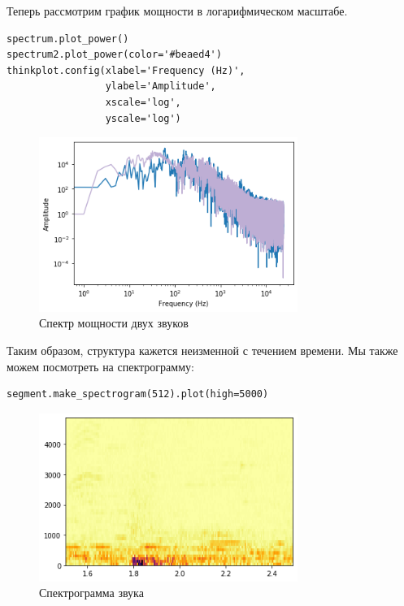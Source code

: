 \documentclass[a4paper,12pt]{report}
\begin{document}
Теперь рассмотрим график мощности в логарифмическом масштабе.

\begin{lstlisting}[caption=Спектр мощности двух звуков]
spectrum.plot_power()
spectrum2.plot_power(color='#beaed4')
thinkplot.config(xlabel='Frequency (Hz)',
                 ylabel='Amplitude',
                 xscale='log', 
                 yscale='log')
\end{lstlisting}

\begin{figure}[H]
        \centering
        \includegraphics[width=0.75\textwidth]{lab4_fig1_4.png}
        \caption{Спектр мощности двух звуков}
        \label{fig:lab4_fig1_4}
\end{figure}

Таким образом, структура кажется неизменной с течением времени. Мы также можем посмотреть на спектрограмму:

\begin{lstlisting}[caption=Спектрограмма звука]
segment.make_spectrogram(512).plot(high=5000)
\end{lstlisting}

\begin{figure}[H]
        \centering
        \includegraphics[width=0.75\textwidth]{lab4_fig1_5.png}
        \caption{Спектрограмма звука}
        \label{fig:lab4_fig1_5}
\end{figure}
\end{document}
